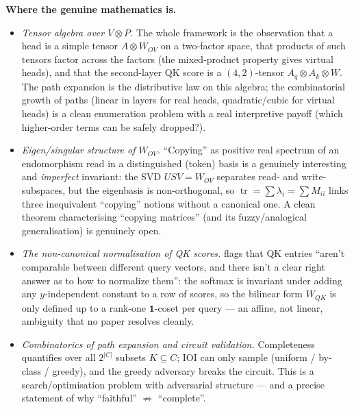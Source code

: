 \textbf{Where the genuine mathematics is.}
\begin{itemize}[leftmargin=1.4em]
\item \emph{Tensor algebra over $V\otimes P$.} The whole framework is the observation that a head is a simple tensor $A\otimes W_{OV}$ on a two-factor space, that products of such tensors factor across the factors (the mixed-product property gives virtual heads), and that the second-layer QK score is a $(4,2)$-tensor $A_q\otimes A_k\otimes W$. The path expansion is the distributive law on this algebra; the combinatorial growth of paths (linear in layers for real heads, quadratic/cubic for virtual heads) is a clean enumeration problem with a real interpretive payoff (which higher-order terms can be safely dropped?).
\item \emph{Eigen/singular structure of $W_{OV}$.} ``Copying'' as positive real spectrum of an endomorphism read in a distinguished (token) basis is a genuinely interesting and \emph{imperfect} invariant: the SVD $USV=W_{OV}$ separates read- and write-subspaces, but the eigenbasis is non-orthogonal, so $\operatorname{tr}=\sum\lambda_i=\sum M_{ii}$ links three inequivalent ``copying'' notions without a canonical one. A clean theorem characterising ``copying matrices'' (and its fuzzy/analogical generalisation) is genuinely open.
\item \emph{The non-canonical normalisation of QK scores.} \textcite{framework} flags that QK entries ``aren't comparable between different query vectors, and there isn't a clear right answer as to how to normalize them'': the softmax is invariant under adding any $y$-independent constant to a row of scores, so the bilinear form $W_{QK}$ is only defined up to a rank-one $\mathbf{1}$-coset per query --- an affine, not linear, ambiguity that no paper resolves cleanly.
\item \emph{Combinatorics of path expansion and circuit validation.} Completeness quantifies over all $2^{|C|}$ subsets $K\subseteq C$; IOI can only sample (uniform / by-class / greedy), and the greedy adversary breaks the circuit. This is a search/optimisation problem with adversarial structure --- and a precise statement of why ``faithful'' $\not\Rightarrow$ ``complete''.
\end{itemize}


